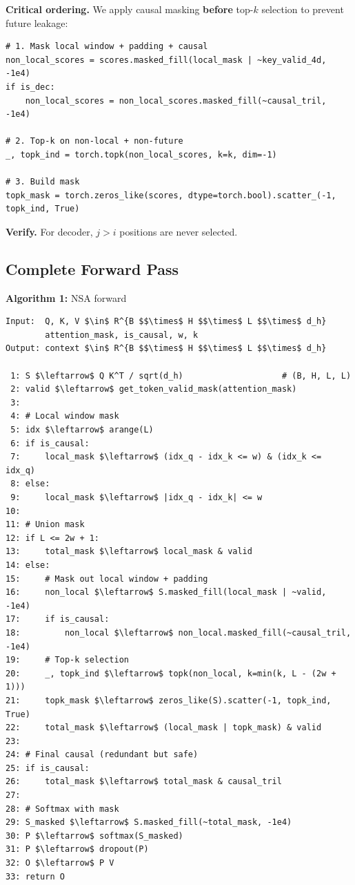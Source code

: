 \textbf{Critical ordering.} We apply causal masking \textbf{before} top-$k$ selection 
to prevent future leakage:

\begin{lstlisting}
# 1. Mask local window + padding + causal
non_local_scores = scores.masked_fill(local_mask | ~key_valid_4d, -1e4)
if is_dec:
    non_local_scores = non_local_scores.masked_fill(~causal_tril, -1e4)

# 2. Top-k on non-local + non-future
_, topk_ind = torch.topk(non_local_scores, k=k, dim=-1)

# 3. Build mask
topk_mask = torch.zeros_like(scores, dtype=torch.bool).scatter_(-1, topk_ind, True)
\end{lstlisting}

\textbf{Verify.} For decoder, $j > i$ positions are never selected.

\subsection{Complete Forward Pass}

\textbf{Algorithm 1:} NSA forward
\begin{lstlisting}
Input:  Q, K, V $\in$ R^{B $$\times$ H $$\times$ L $$\times$ d_h}
        attention_mask, is_causal, w, k
Output: context $\in$ R^{B $$\times$ H $$\times$ L $$\times$ d_h}

 1: S $\leftarrow$ Q K^T / sqrt(d_h)                    # (B, H, L, L)
 2: valid $\leftarrow$ get_token_valid_mask(attention_mask)
 3:
 4: # Local window mask
 5: idx $\leftarrow$ arange(L)
 6: if is_causal:
 7:     local_mask $\leftarrow$ (idx_q - idx_k <= w) & (idx_k <= idx_q)
 8: else:
 9:     local_mask $\leftarrow$ |idx_q - idx_k| <= w
10:
11: # Union mask
12: if L <= 2w + 1:
13:     total_mask $\leftarrow$ local_mask & valid
14: else:
15:     # Mask out local window + padding
16:     non_local $\leftarrow$ S.masked_fill(local_mask | ~valid, -1e4)
17:     if is_causal:
18:         non_local $\leftarrow$ non_local.masked_fill(~causal_tril, -1e4)
19:     # Top-k selection
20:     _, topk_ind $\leftarrow$ topk(non_local, k=min(k, L - (2w + 1)))
21:     topk_mask $\leftarrow$ zeros_like(S).scatter(-1, topk_ind, True)
22:     total_mask $\leftarrow$ (local_mask | topk_mask) & valid
23:
24: # Final causal (redundant but safe)
25: if is_causal:
26:     total_mask $\leftarrow$ total_mask & causal_tril
27:
28: # Softmax with mask
29: S_masked $\leftarrow$ S.masked_fill(~total_mask, -1e4)
30: P $\leftarrow$ softmax(S_masked)
31: P $\leftarrow$ dropout(P)
32: O $\leftarrow$ P V
33: return O
\end{lstlisting}

